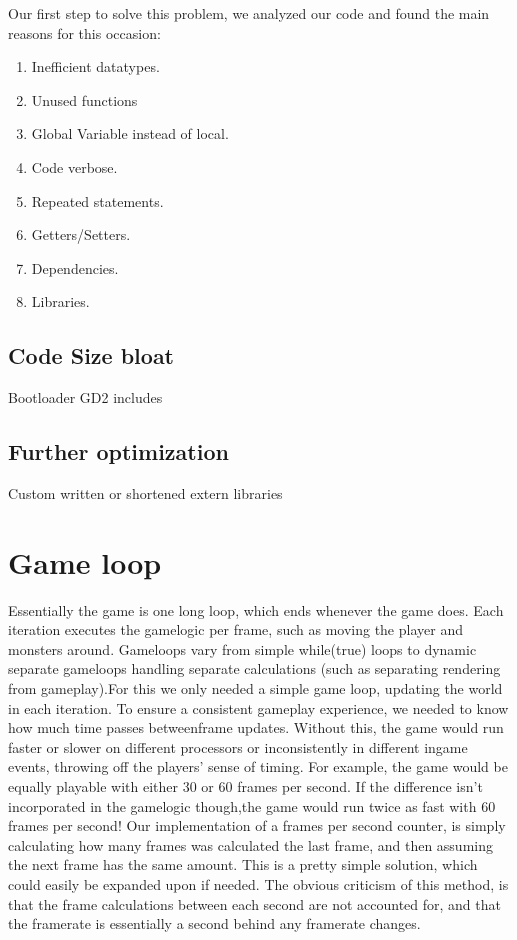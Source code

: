 Our first step to solve this problem, we analyzed our code and found the main
reasons for this occasion:

\begin{enumerate} \item Inefficient datatypes.  \item Unused functions \item
    Global Variable instead of local.  \item Code verbose.  \item Repeated
    statements.  \item Getters/Setters.  \item Dependencies.  \item Libraries.
  \end{enumerate}

\subsection{Code Size bloat} Bootloader GD2 includes \subsection{Further
optimization} Custom written or shortened extern libraries

\section{Game loop} Essentially the game is one long loop, which ends whenever
the game does. Each iteration executes the gamelogic per frame, such as moving
the player and monsters around. Gameloops vary from simple while(true) loops
to dynamic separate gameloops handling separate calculations (such as
separating rendering from gameplay).For this we only needed a simple game
loop, updating the world in each iteration. To ensure a consistent gameplay
experience, we needed to know how much time passes betweenframe updates.
Without this, the game would run faster or slower on different processors or
inconsistently in different ingame events, throwing off the players’ sense of
timing. For example, the game would be equally playable with either 30 or 60
frames per second. If the difference isn’t incorporated in the gamelogic
though,the game would run twice as fast with 60 frames per second! Our
implementation of a frames per second counter, is simply calculating how many
frames was calculated the last frame, and then assuming the next frame has the
same amount. This is a pretty simple solution, which could easily be expanded
upon if needed. The obvious criticism of this method, is that the frame
calculations between each second are not accounted for, and that the framerate
is essentially a second behind any framerate changes.

